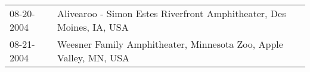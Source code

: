\begin{supertabular}{ll}
 08-20-2004 &  Alivearoo - Simon Estes Riverfront Amphitheater, Des Moines, IA, USA \\
 08-21-2004 &     Weesner Family Amphitheater, Minnesota Zoo, Apple Valley, MN, USA \\
\end{supertabular}
